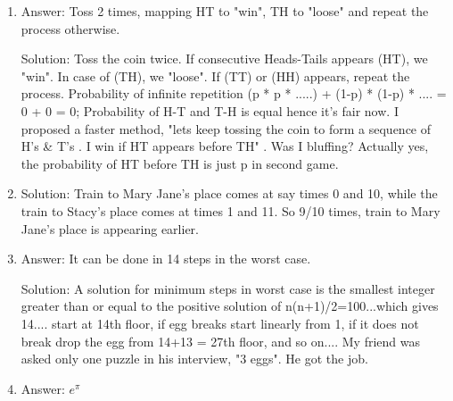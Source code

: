 \begin{enumerate}
\item
Answer: Toss 2 times, mapping HT to "win", TH to "loose" and repeat the process otherwise.
 
Solution: Toss the coin twice. If consecutive Heads-Tails appears (HT), we "win". In case of (TH), we "loose". If (TT) or (HH) appears, repeat the process. Probability of infinite repetition (p * p * .....) + (1-p) * (1-p) * .... = 0 + 0 = 0;
Probability of H-T and T-H is equal hence it's fair now.
I proposed a faster method, "lets keep tossing the coin to form a sequence of H's \& T's . I win if HT appears before TH" . Was I bluffing?
Actually yes, the probability of HT before TH is just p in second game.




\item
Solution: Train to Mary Jane's place comes at say times 0 and 10, while the train to Stacy's place comes at times 1 and 11. So 9/10 times, train to Mary Jane's place is appearing earlier.




\item
Answer: It can be done in 14 steps in the worst case.
 
Solution: A solution for minimum steps in worst case is the smallest integer greater than or equal to the positive solution of n(n+1)/2=100...which gives 14....
start at 14th floor, if egg breaks start linearly from 1, if it does not break drop the egg from 14+13 = 27th floor, and so on....
My friend was asked only one puzzle in his interview, "3 eggs". He got the job.




\item
Answer: $e^\pi$
 

\end{enumerate}
